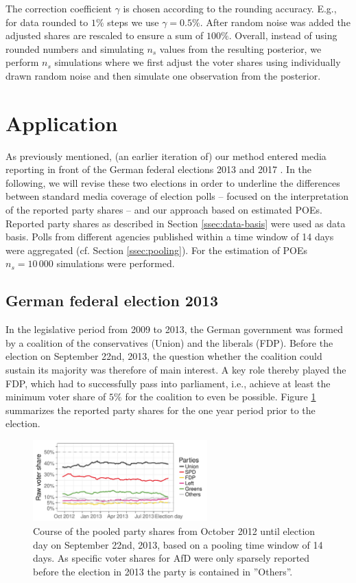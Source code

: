 \documentclass[smallcondensed]{svjour3}     %
\begin{document}
The correction coefficient $\gamma$ is chosen according to the rounding accuracy.
E.g., for data rounded to $1\%$ steps we use $\gamma = 0.5\%$. After random noise
was added the adjusted shares are rescaled to ensure a sum of $100\%$. Overall,
instead of using rounded numbers and simulating $n_s$ values from the resulting
posterior, we perform $n_s$ simulations where we first adjust the voter shares
using individually drawn random noise and then simulate one observation from the
posterior.\\


\section{Application} \label{sec:application}
As previously mentioned, (an earlier iteration of) our method entered media reporting in front of the German federal elections 2013 and 2017 \citep[cf.][]{wahlistik_2013, gelitz_2017}.
In the following, we will revise these two elections in order to underline the
differences between standard media coverage of election polls
-- focused on the interpretation of the reported party shares --
and our approach based on estimated POEs. Reported party shares as
described in Section \ref{ssec:data-basis} were used as data basis.
Polls from different agencies published within a time window of 14 days were
aggregated (cf. Section \ref{ssec:pooling}). For the estimation of POEs $n_{s} = 10\,000$ simulations were performed.


\subsection{German federal election 2013} \label{subsec:2013}
In the legislative period from 2009 to 2013, the German government was formed by
a coalition of the conservatives (Union) and the liberals (FDP). Before the
election on September 22nd, 2013, the question whether the coalition could
sustain its majority was therefore of main interest.
A key role thereby played the FDP, which had to successfully pass into parliament,
i.e., achieve at least the minimum voter share of $5\%$ for the coalition
to even be possible. Figure \ref{fig:2013} summarizes the reported party
shares for the one year period prior to the election.

\begin{figure}[H]\centering
\includegraphics[width=0.6\textwidth]{figures/2013_pooled_rawShares.pdf}
\caption{Course of the pooled party shares from October 2012 until election day on
September 22nd, 2013, based on a pooling time window of 14 days.
As specific voter shares for AfD were only sparsely reported before the election in 2013
the party is contained in ''Others''.
\label{fig:2013}
}
\end{figure}
\end{document}
